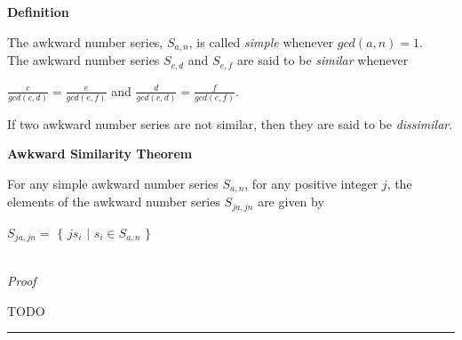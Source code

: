 \documentclass[a4paper,12pt]{article}
\begin{document}
\label{definition:simple_awkward_number_series}
\label{definition:similar_awkward_number_series}
\label{definition:dissimilar_awkward_number_series}
\hypertarget{definition:simple_awkward_number_series}{}
\hypertarget{definition:similar_awkward_number_series}{}
\hypertarget{definition:dissimilar_awkward_number_series}{}
\begin{tcolorbox}
\textbf{Definition}

\noindent The awkward number series, $S_{a, n}$, is called \textit{simple} whenever $gcd(a,n) = 1$.\\

\noindent The awkward number series $S_{c, d}$ and $S_{e, f}$ are said to be \textit{similar} whenever

\begin{center}
$\frac{c}{gcd(c, d)} = \frac{e}{gcd(e, f)}$ and $\frac{d}{gcd(c,d)} = \frac{f}{gcd(e, f)}$.
\end{center}

\noindent If two awkward number series are not similar, then they are said to be \textit{dissimilar}.

\end{tcolorbox}








\label{theorem:similar_awkward_series}
\hypertarget{theorem:similar_awkward_series}{}
\begin{tcolorbox}
\textbf{Awkward Similarity Theorem}

For any simple awkward number series $S_{a,n}$, for any positive integer $j$, the elements of the awkward number series $S_{ja, jn}$ are given by

\begin{center}
$S_{ja, jn} = $ $\{$ $js_i$ $|$ $s_i \in S_{a,n}$ $\}$
\end{center} 
\end{tcolorbox}

\noindent \\
\textit{Proof}

TODO

\begin{center}
\noindent\rule{8cm}{0.4pt}
\end{center}
\end{document}
